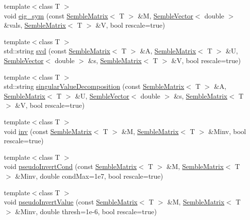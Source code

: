 \begin{DoxyCompactItemize}
\item 
{\footnotesize template$<$class T $>$ }\\void \mbox{\hyperlink{namespaceSEMBLE_a302bd8012ba286b83aeff7e786f8294e}{eig\+\_\+sym}} (const \mbox{\hyperlink{structSEMBLE_1_1SembleMatrix}{Semble\+Matrix}}$<$ T $>$ \&M, \mbox{\hyperlink{structSEMBLE_1_1SembleVector}{Semble\+Vector}}$<$ double $>$ \&vals, \mbox{\hyperlink{structSEMBLE_1_1SembleMatrix}{Semble\+Matrix}}$<$ T $>$ \&V, bool rescale=true)
\item 
{\footnotesize template$<$class T $>$ }\\std\+::string \mbox{\hyperlink{namespaceSEMBLE_acc7fdc62577ac500ca167f9fc7ed8fe9}{svd}} (const \mbox{\hyperlink{structSEMBLE_1_1SembleMatrix}{Semble\+Matrix}}$<$ T $>$ \&A, \mbox{\hyperlink{structSEMBLE_1_1SembleMatrix}{Semble\+Matrix}}$<$ T $>$ \&U, \mbox{\hyperlink{structSEMBLE_1_1SembleVector}{Semble\+Vector}}$<$ double $>$ \&s, \mbox{\hyperlink{structSEMBLE_1_1SembleMatrix}{Semble\+Matrix}}$<$ T $>$ \&V, bool rescale=true)
\item 
{\footnotesize template$<$class T $>$ }\\std\+::string \mbox{\hyperlink{namespaceSEMBLE_a5f106e353054ed7ac809a9d21acdbd1c}{singular\+Value\+Decomposition}} (const \mbox{\hyperlink{structSEMBLE_1_1SembleMatrix}{Semble\+Matrix}}$<$ T $>$ \&A, \mbox{\hyperlink{structSEMBLE_1_1SembleMatrix}{Semble\+Matrix}}$<$ T $>$ \&U, \mbox{\hyperlink{structSEMBLE_1_1SembleVector}{Semble\+Vector}}$<$ double $>$ \&s, \mbox{\hyperlink{structSEMBLE_1_1SembleMatrix}{Semble\+Matrix}}$<$ T $>$ \&V, bool rescale=true)
\item 
{\footnotesize template$<$class T $>$ }\\void \mbox{\hyperlink{namespaceSEMBLE_aa305667d8c31ec6afd5718f50be47c22}{inv}} (const \mbox{\hyperlink{structSEMBLE_1_1SembleMatrix}{Semble\+Matrix}}$<$ T $>$ \&M, \mbox{\hyperlink{structSEMBLE_1_1SembleMatrix}{Semble\+Matrix}}$<$ T $>$ \&Minv, bool rescale=true)
\item 
{\footnotesize template$<$class T $>$ }\\void \mbox{\hyperlink{namespaceSEMBLE_ad26b9b7468ab7482dfcd5909c46358cf}{pseudo\+Invert\+Cond}} (const \mbox{\hyperlink{structSEMBLE_1_1SembleMatrix}{Semble\+Matrix}}$<$ T $>$ \&M, \mbox{\hyperlink{structSEMBLE_1_1SembleMatrix}{Semble\+Matrix}}$<$ T $>$ \&Minv, double cond\+Max=1e7, bool rescale=true)
\item 
{\footnotesize template$<$class T $>$ }\\void \mbox{\hyperlink{namespaceSEMBLE_abf6d50f5d45b7e87cafac5e1ad6c5225}{pseudo\+Invert\+Value}} (const \mbox{\hyperlink{structSEMBLE_1_1SembleMatrix}{Semble\+Matrix}}$<$ T $>$ \&M, \mbox{\hyperlink{structSEMBLE_1_1SembleMatrix}{Semble\+Matrix}}$<$ T $>$ \&Minv, double thresh=1e-\/6, bool rescale=true)

\end{DoxyCompactItemize}

